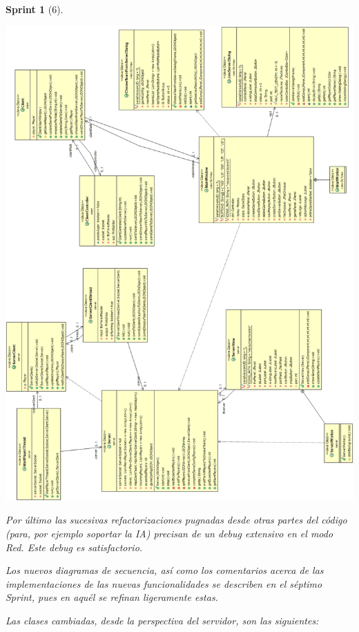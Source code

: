 \documentclass[12pt,a4paper,openright]{book}
\theoremstyle{break}
\newtheorem*{sprint}{Sprint}
\begin{document}
\begin{sprint}[6]
\begin{itemize}
\begin{center}
\includegraphics[scale=0.45]{UMLClasesRedSprint6.png} 
\end{center}

\end{itemize}

Por último las sucesivas refactorizaciones pugnadas desde otras partes del código (para, por ejemplo soportar la IA) precisan de un debug extensivo en el modo Red. Este debug es satisfactorio.

Los nuevos diagramas de secuencia, así como los comentarios acerca de las implementaciones de las nuevas funcionalidades se describen en el séptimo Sprint, pues en aquél se refinan ligeramente estas.

Las clases cambiadas, desde la perspectiva del servidor, son las siguientes:

\begin{itemize}


\end{itemize}
\end{sprint}
\end{document}

